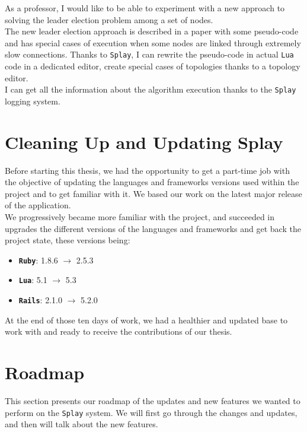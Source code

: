 \documentclass{eplmastersthesis}
\begin{document}
        As a professor, I would like to be able to experiment with a new
        approach to solving the leader election problem among a set of
        nodes.\\
        The new leader election approach is described in a paper with some
        pseudo-code and has special cases of execution when some nodes
        are linked through extremely slow connections.
        Thanks to \texttt{Splay}, I can rewrite the pseudo-code in actual
        \texttt{Lua} code in a dedicated editor, create special cases of topologies
        thanks to a topology editor.\\
        I can get all the information about the algorithm execution
        thanks to the \texttt{Splay} logging system.

    \section{Cleaning Up and Updating Splay}

      Before starting this thesis, we had the opportunity to get a part-time
      job with the objective of updating the languages and frameworks versions
      used within the project and to get familiar with it. We based our work on
      the latest major release of the application.\\

      We progressively became more familiar with the project, and succeeded
      in upgrades the different versions of the languages and frameworks and
      get back the project state, these versions being:

      \begin{itemize}
        \item \textbf{\texttt{Ruby}}: 1.8.6 $\rightarrow$ 2.5.3
        \item \textbf{\texttt{Lua}}: 5.1 $\rightarrow$ 5.3
        \item \textbf{\texttt{Rails}}: 2.1.0 $\rightarrow$ 5.2.0
      \end{itemize}

      At the end of those ten days of work, we had a healthier and updated
      base to work with and ready to receive the contributions of our thesis.

    \section{Roadmap}

      This section presents our roadmap of the updates and new features
      we wanted to perform on the \texttt{Splay} system. We will first go through
      the changes and updates, and then will talk about the new features.
\end{document}
